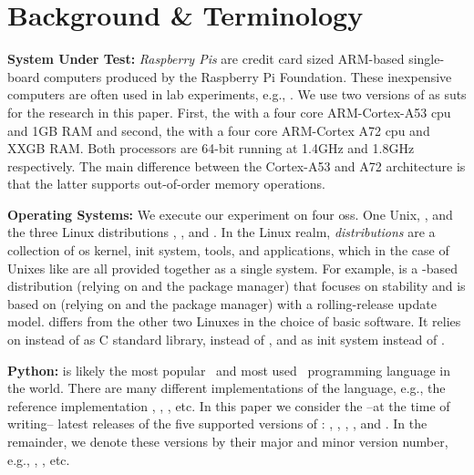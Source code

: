 \section{Background \& Terminology}\label{sec:background}

\noindent\textbf{System Under Test:} \emph{Raspberry Pis} are credit card sized ARM-based single-board computers produced by the Raspberry Pi Foundation\cite{raspberry_pi_website}.
These inexpensive computers are often used in lab experiments, e.g., \cite{zhao2015exploring,pfeiffer2024energy}.
We use two versions of  as \glspl{sut} for the research in this paper.
First, the  with a four core ARM-Cortex-A53 \gls{cpu} and 1GB RAM and second, the  with a four core ARM-Cortex A72 \gls{cpu} and XXGB RAM.
Both processors are 64-bit running at 1.4GHz and 1.8GHz respectively.
The main difference between the Cortex-A53 and A72 architecture is that the latter supports out-of-order memory operations.

\noindent\textbf{Operating Systems:} We execute our experiment on four \glspl{os}.
One Unix, \cite{freebsd_website}, and the three Linux distributions \cite{alpine_website}, \cite{manjaro_website}, and \cite{ubuntu_website}.
In the Linux realm, \emph{distributions} are a collection of \gls{os} kernel, init system, tools, and applications, which in the case of Unixes like  are all provided together as a single system.
For example,  is a -based distribution (relying on  and the  package manager) that focuses on stability and  is based on  (relying on  and the  package manager) with a rolling-release update model.
 differs from the other two Linuxes in the choice of basic software.
It relies on  instead of  as C standard library,  instead of , and  as init system instead of .

\noindent\textbf{Python:} is likely the most popular~\cite{djurdjev2024popularity,pypl,tiobe} and most used~\cite{stackover, statista} programming language in the world.
There are many different implementations of the language, e.g., the reference implementation \cp, , , etc.
In this paper we consider the --at the time of writing-- latest releases of the five supported versions of \cp: , , , , and .
In the remainder, we denote these versions by their major and minor version number, e.g., , , etc.

